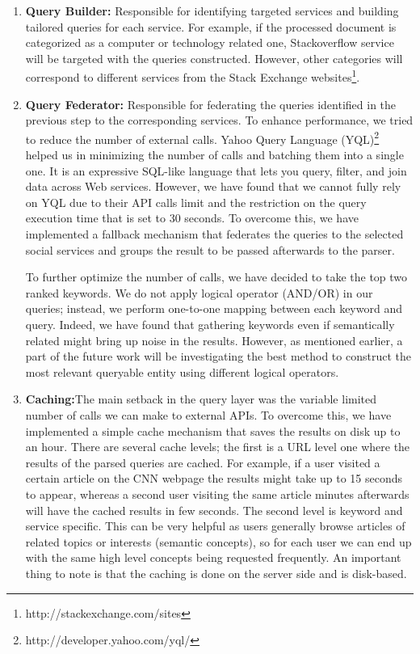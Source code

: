 \documentclass[oribibl]{llncs}
\begin{document}
\begin{enumerate}
\item {\bf Query Builder:} Responsible for identifying targeted services and building tailored queries for each service. For example, if the processed document is categorized as a computer or technology related one, Stackoverflow service will be targeted with the queries constructed. However, other categories will correspond to different services from the Stack Exchange websites\footnote{http://stackexchange.com/sites}.
\item {\bf Query Federator:} Responsible for federating the queries identified in the previous step to the corresponding services. To enhance performance, we tried to reduce the number of external calls. Yahoo Query Language (YQL)\footnote{http://developer.yahoo.com/yql/} helped us in minimizing the number of calls and batching them into a single one. It is an expressive SQL-like language that lets you query, filter, and join data across Web services. However, we have found that we cannot fully rely on YQL due to their API calls limit and the restriction on the query execution time that is set to 30 seconds. To overcome this, we have implemented a fallback mechanism that federates the queries to the selected social services and groups the result to be passed afterwards to the parser.

To further optimize the number of calls, we have decided to take the top two ranked keywords. We do not apply logical operator (AND/OR) in our queries; instead, we perform one-to-one mapping between each keyword and query. Indeed, we have found that gathering keywords even if semantically related might bring up noise in the results. However, as mentioned earlier, a part of the future work will be investigating the best method to construct the most relevant queryable entity using different logical operators.
\item {\bf Caching:}The main setback in the query layer was the variable limited number of calls we can make to external APIs. To overcome this, we have implemented a simple cache mechanism that saves the results on disk up to an hour. There are several cache levels; the first is a URL level one where the results of the parsed queries are cached. For example, if a user visited a certain article on the CNN webpage the results might take up to 15 seconds to appear, whereas a second user visiting the same article minutes afterwards will have the cached results in few seconds. The second level is keyword and service specific. This can be very helpful as users generally browse articles of related topics or interests (semantic concepts), so for each user we can end up with the same high level concepts being requested frequently. An important thing to note is that the caching is done on the server side and is disk-based.
\end{enumerate}
\end{document}
